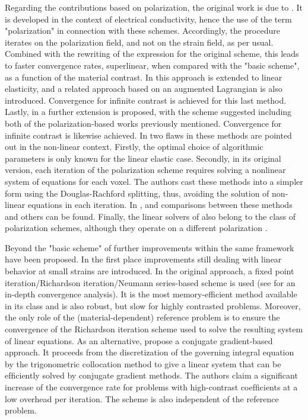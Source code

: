 Regarding the contributions based on polarization, the original work is due to \cite{eyre_fast_1999}.
It is developed in the context of electrical conductivity, hence the use of the term "polarization" in connection with these schemes.
Accordingly, the procedure iterates on the polarization field, and not on the strain field, as per usual.
Combined with the rewriting of the expression for the original scheme, this leads to faster convergence rates, superlinear, when compared with the "basic scheme", as a function of the material contrast.
In \cite{michel_computational_2001} this approach is extended to linear elasticity, and a related approach based on an augmented Lagrangian is also introduced.
Convergence for infinite contrast is achieved for this last method.
Lastly, in \cite{monchiet_polarization-based_2012} a further extension is proposed, with the scheme suggested including both of the polarization-based works previously mentioned.
Convergence for infinite contrast is likewise achieved.
In \cite{schneider_polarization-based_2019} two flaws in these methods are pointed out in the non-linear context.
Firstly, the optimal choice of algorithmic parameters is only known for the linear elastic case.
Secondly, in its original version, each iteration of the polarization scheme requires solving a nonlinear system of equations for each voxel.
The authors cast these methods into a simpler form using the Douglas-Rachford splitting, thus, avoiding the solution of non-linear equations in each iteration.
In \cite{moulinec_comparison_2014}, \cite{moulinec_comparison_2014-1} and \cite{schneider_polarization-based_2019} comparisons between these methods and others can be found.
Finally, the linear solvers of \cite{brisard_fft-based_2010, brisard_combining_2012} also belong to the class of polarization schemes, although they operate on a different polarization \citep{schneider_lippmannschwinger_2020}.

Beyond the "basic scheme" of \cite{moulinec_fast_1994} further improvements within the same framework have been proposed.
In the first place improvements still dealing with linear behavior at small strains are introduced.
In the original approach, a fixed point iteration/Richardson iteration/Neumann series-based scheme is used (see \cite{moulinec_convergence_2018} for an in-depth convergence analysis).
It is the most memory-efficient method available in its class and is also robust, but slow for highly contrasted problems.
Moreover, the only role of the (material-dependent) reference problem is to ensure the convergence of the Richardson iteration scheme used to solve the resulting system of linear equations.
As an alternative, \cite{zeman_accelerating_2010} propose a conjugate gradient-based approach.
It proceeds from the discretization of the governing integral equation by the trigonometric collocation method to give a linear system that can be efﬁciently solved by conjugate gradient methods.
The authors claim a signiﬁcant increase of the convergence rate for problems with high-contrast coefﬁcients at a low overhead per iteration.
The scheme is also independent of the reference problem.

